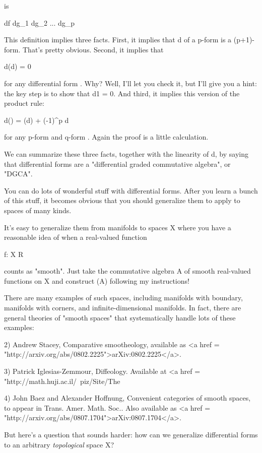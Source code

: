 is 

df dg_{1} dg_{2} ... dg_{p}

This definition implies three facts.  First, it implies that d of a
p-form is a (p+1)-form.  That's pretty obvious.  Second, it implies
that

d(d\omega ) = 0 

for any differential form \omega .  Why?  Well, I'll let you check it, but
I'll give you a hint: the key step is to show that d1 = 0.  And third,
it implies this version of the product rule:

d(\nu \omega ) = (d\nu ) \omega  + (-1)^{p} \nu d\omega  

for any p-form \nu  and q-form \omega .  Again the proof is a little
calculation.

We can summarize these three facts, together with the linearity of d, by
saying that differential forms are a "differential graded commutative
algebra", or "DGCA".  

You can do lots of wonderful stuff with differential forms.  After you
learn a bunch of this stuff, it becomes obvious that you should
generalize them to apply to spaces of many kinds.  

It's easy to generalize them from manifolds to spaces X where you 
have a reasonable idea of when a real-valued function

f: X \to  R

counts as "smooth".  Just take the commutative algebra A of smooth
real-valued functions on X and construct \Omega (A) following my
instructions!

There are many examples of such spaces, including manifolds with
boundary, manifolds with corners, and infinite-dimensional manifolds.
In fact, there are general theories of "smooth spaces" that
systematically handle lots of these examples:

2) Andrew Stacey, Comparative smootheology, available as
<a href = "http://arxiv.org/abs/0802.2225">arXiv:0802.2225</a>.

3) Patrick Iglesias-Zemmour, Diffeology.  Available at
<a href = "http://math.huji.ac.il/~piz/Site/The%

4) John Baez and Alexander Hoffnung, Convenient categories of smooth
spaces, to appear in Trans. Amer. Math. Soc..  Also available as
<a href = "http://arxiv.org/abs/0807.1704">arXiv:0807.1704</a>.

But here's a question that sounds harder: how can we generalize differential
forms to an arbitrary \emph{topological} space X?

